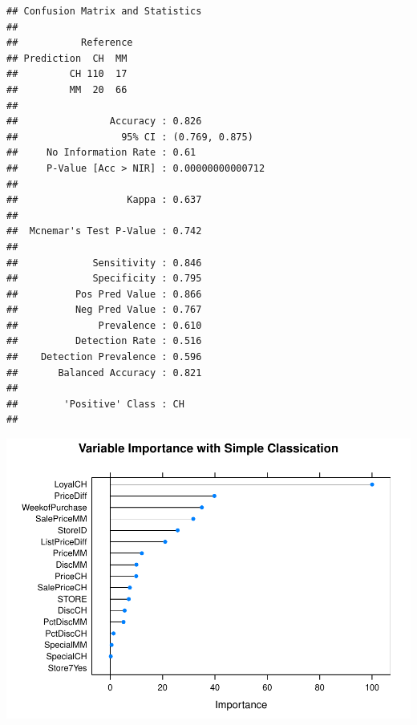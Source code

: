 \documentclass[
]{book}
\newenvironment{Shaded}{\begin{snugshade}}{\end{snugshade}}
\newcommand{\CommentTok}[1]{\textcolor[rgb]{0.56,0.35,0.01}{\textit{#1}}}
\newcommand{\DataTypeTok}[1]{\textcolor[rgb]{0.13,0.29,0.53}{#1}}
\newcommand{\DecValTok}[1]{\textcolor[rgb]{0.00,0.00,0.81}{#1}}
\newcommand{\KeywordTok}[1]{\textcolor[rgb]{0.13,0.29,0.53}{\textbf{#1}}}
\newcommand{\NormalTok}[1]{#1}
\newcommand{\OperatorTok}[1]{\textcolor[rgb]{0.81,0.36,0.00}{\textbf{#1}}}
\newcommand{\StringTok}[1]{\textcolor[rgb]{0.31,0.60,0.02}{#1}}
\begin{document}
\begin{verbatim}
## Confusion Matrix and Statistics
## 
##           Reference
## Prediction  CH  MM
##         CH 110  17
##         MM  20  66
##                                           
##                Accuracy : 0.826           
##                  95% CI : (0.769, 0.875)  
##     No Information Rate : 0.61            
##     P-Value [Acc > NIR] : 0.00000000000712
##                                           
##                   Kappa : 0.637           
##                                           
##  Mcnemar's Test P-Value : 0.742           
##                                           
##             Sensitivity : 0.846           
##             Specificity : 0.795           
##          Pos Pred Value : 0.866           
##          Neg Pred Value : 0.767           
##              Prevalence : 0.610           
##          Detection Rate : 0.516           
##    Detection Prevalence : 0.596           
##       Balanced Accuracy : 0.821           
##                                           
##        'Positive' Class : CH              
## 
\end{verbatim}

\begin{Shaded}
\end{Shaded}

\includegraphics{data-sci_files/figure-latex/unnamed-chunk-114-2.pdf}
\end{document}
